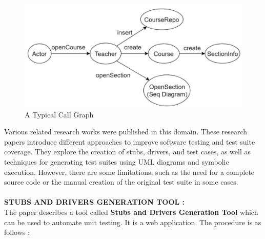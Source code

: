 \documentclass{article}
\begin{document}



\begin{figure}
    \centering
    \includegraphics[scale=0.43]{Untitled.png}
    \caption{A Typical Call Graph}
    \label{fig:enter-label}
\end{figure}


Various related research works were published in this domain.
These research papers introduce different approaches to improve software testing and test suite coverage. They explore the creation of stubs, drivers, and test cases, as well as techniques for generating test suites using UML diagrams and symbolic execution. However, there are some limitations, such as the need for a complete source code or the manual creation of the original test suite in some cases.\\
\\ 

\textbf{STUBS AND DRIVERS GENERATION TOOL : }\\

The paper describes a tool called \textbf{Stubs and Drivers Generation Tool} which can be used to automate unit testing. It is a web application. The procedure is as follows :\\
\end{document}
